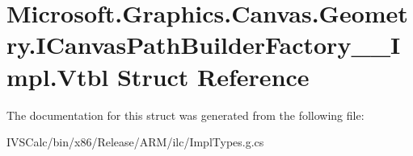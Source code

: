 \hypertarget{struct_microsoft_1_1_graphics_1_1_canvas_1_1_geometry_1_1_i_canvas_path_builder_factory_____impl_1_1_vtbl}{}\section{Microsoft.\+Graphics.\+Canvas.\+Geometry.\+I\+Canvas\+Path\+Builder\+Factory\+\_\+\+\_\+\+Impl.\+Vtbl Struct Reference}
\label{struct_microsoft_1_1_graphics_1_1_canvas_1_1_geometry_1_1_i_canvas_path_builder_factory_____impl_1_1_vtbl}


The documentation for this struct was generated from the following file\+:\begin{DoxyCompactItemize}
\item 
I\+V\+S\+Calc/bin/x86/\+Release/\+A\+R\+M/ilc/Impl\+Types.\+g.\+cs\end{DoxyCompactItemize}
